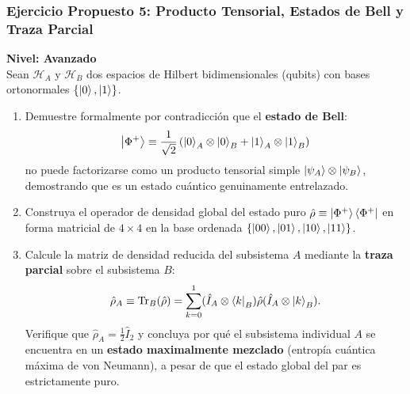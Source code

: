 

\subsubsection[Ejercicio 5: Estados de Bell y traza parcial]{Ejercicio Propuesto 5: Producto Tensorial, Estados de Bell y Traza Parcial}
\begin{ejerciciobox}
    \textbf{Nivel: Avanzado}\\
    Sean $\mathcal{H}_A$ y $\mathcal{H}_B$ dos espacios de Hilbert bidimensionales (qubits) con bases ortonormales $\{\left| 0 \right\rangle, \left| 1 \right\rangle\}$.
    \begin{enumerate}
        \item Demuestre formalmente por contradicción que el \textbf{estado de Bell}:
        \begin{equation}
            \left| \Phi^+ \right\rangle \equiv \frac{1}{\sqrt{2}}\left( \left| 0 \right\rangle_A \otimes \left| 0 \right\rangle_B + \left| 1 \right\rangle_A \otimes \left| 1 \right\rangle_B \right)
        \end{equation}
        no puede factorizarse como un producto tensorial simple $\left| \psi_A \right\rangle \otimes \left| \psi_B \right\rangle$, demostrando que es un estado cuántico genuinamente entrelazado.
        \item Construya el operador de densidad global del estado puro $\hat{\rho} \equiv \left| \Phi^+ \right\rangle\left\langle \Phi^+ \right|$ en forma matricial de $4\times 4$ en la base ordenada $\{\left| 00 \right\rangle, \left| 01 \right\rangle, \left| 10 \right\rangle, \left| 11 \right\rangle\}$.
        \item Calcule la matriz de densidad reducida del subsistema $A$ mediante la \textbf{traza parcial} sobre el subsistema $B$:
        \begin{equation}
            \hat{\rho}_A \equiv \mathrm{Tr}_B(\hat{\rho}) = \sum_{k=0}^1 (\hat{I}_A \otimes \left\langle k \right|_B)\hat{\rho}(\hat{I}_A \otimes \left| k \right\rangle_B).
        \end{equation}
        Verifique que $\hat{\rho}_A = \frac{1}{2}\hat{I}_2$ y concluya por qué el subsistema individual $A$ se encuentra en un \textbf{estado maximalmente mezclado} (entropía cuántica máxima de von Neumann), a pesar de que el estado global del par es estrictamente puro.
    \end{enumerate}
\end{ejerciciobox}
